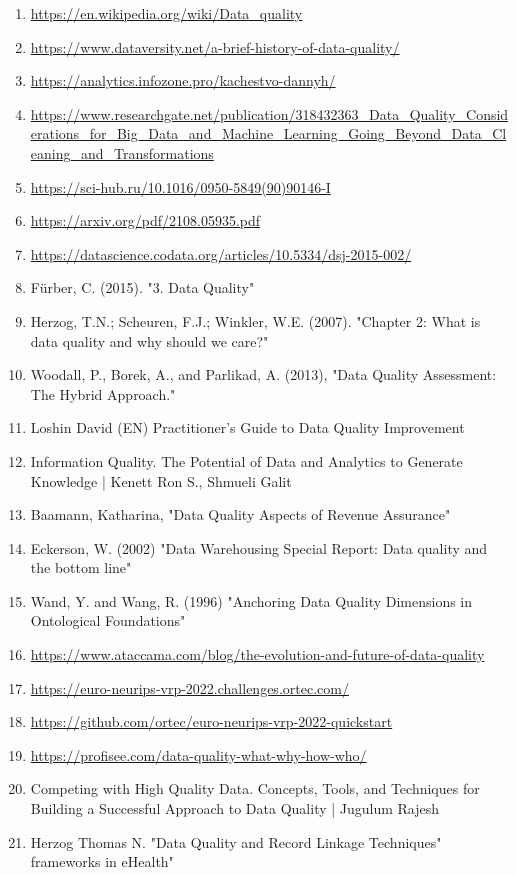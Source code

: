 \documentclass{article}
\begin{document}
\begin{enumerate}
    \item \url{https://en.wikipedia.org/wiki/Data_quality}
    \item \url{https://www.dataversity.net/a-brief-history-of-data-quality/}
    \item \url{https://analytics.infozone.pro/kachestvo-dannyh/}
    \item \url{https://www.researchgate.net/publication/318432363_Data_Quality_Considerations_for_Big_Data_and_Machine_Learning_Going_Beyond_Data_Cleaning_and_Transformations}
    \item \url{https://sci-hub.ru/10.1016/0950-5849(90)90146-I}
    \item \url{https://arxiv.org/pdf/2108.05935.pdf}
    \item \url{https://datascience.codata.org/articles/10.5334/dsj-2015-002/}
    \item Fürber, C. (2015). "3. Data Quality"
    \item Herzog, T.N.; Scheuren, F.J.; Winkler, W.E. (2007). "Chapter 2: What is data quality and why should we care?"
    \item Woodall, P., Borek, A., and Parlikad, A. (2013), "Data Quality Assessment: The Hybrid Approach."
    \item Loshin David (EN) Practitioner's Guide to Data Quality Improvement
    \item Information Quality. The Potential of Data and Analytics to Generate Knowledge | Kenett Ron S., Shmueli Galit
    \item Baamann, Katharina, "Data Quality Aspects of Revenue Assurance"
    \item Eckerson, W. (2002) "Data Warehousing Special Report: Data quality and the bottom line"
    \item Wand, Y. and Wang, R. (1996) "Anchoring Data Quality Dimensions in Ontological Foundations"
    \item \url{https://www.ataccama.com/blog/the-evolution-and-future-of-data-quality}
    \item \url{https://euro-neurips-vrp-2022.challenges.ortec.com/}
    \item \url{https://github.com/ortec/euro-neurips-vrp-2022-quickstart}
    \item \url{https://profisee.com/data-quality-what-why-how-who/}
    \item Competing with High Quality Data. Concepts, Tools, and Techniques for Building a Successful Approach to Data Quality | Jugulum Rajesh
    \item Herzog Thomas N. "Data Quality and Record Linkage Techniques" frameworks in eHealth"
\end{enumerate}
\end{document}
